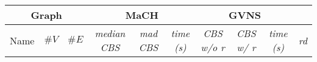 \documentclass{scrartcl}
\theoremstyle{plain}
\newcommand{\algo}{MaCH}
\newcommand{\gvns}{GVNS}
\newcommand{\cbs}{CBS}
\begin{document}
\begin{table}[!ht]
	\centering
	\scriptsize
	\begin{tabular}{|lll|rrr|rrr|r|}
	\hline
\multicolumn{3}{|c}{\textbf{Graph}} &  
\multicolumn{3}{|c|}{\textbf{\algo{}}} & 
\multicolumn{3}{c|}{\textbf{\gvns{}}} & \\ \hline

\multicolumn{1}{|c}{Name} & 
\multicolumn{1}{c}{$\#V$} & 
\multicolumn{1}{c|}{$\#E$} &

\multicolumn{1}{c}{\emph{median \cbs{}}} & 
\multicolumn{1}{c}{\emph{mad \cbs{}}} & 
\multicolumn{1}{c|}{ \emph{time (s)}} &

\multicolumn{1}{c}{\emph{\cbs{} w/o r}} &
\multicolumn{1}{c}{\emph{\cbs{} w/ r}} &
\multicolumn{1}{c|}{ \emph{time (s)}} &
\multicolumn{1}{c|}{\emph{rd}} \\ 
\hline


\end{tabular}
\end{table}
\end{document}
